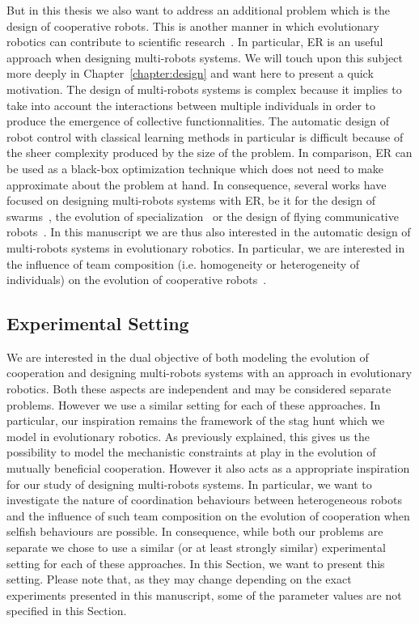     But in this thesis we also want to address an additional problem which is the design of cooperative robots. This is another manner in which evolutionary robotics can contribute to scientific research~\parencite{Trianni2014b, Doncieux2015a}. In particular, ER is an useful approach when designing multi-robots systems. We will touch upon this subject more deeply in Chapter~\ref{chapter:design} and want here to present a quick motivation. The design of multi-robots systems is complex because it implies to take into account the interactions between multiple individuals in order to produce the emergence of collective functionnalities. The automatic design of robot control with classical learning methods in particular is difficult because of the sheer complexity produced by the size of the problem. In comparison, ER can be used as a black-box optimization technique which does not need to make approximate about the problem at hand. In consequence, several works have focused on designing multi-robots systems with ER, be it for the design of swarms~\parencite{Baldassarre2007}, the evolution of specialization~\parencite{Ferrante2015} or the design of flying communicative robots~\parencite{Hauert2014}. In this manuscript we are thus also interested in the automatic design of multi-robots systems in evolutionary robotics. In particular, we are interested in the influence of team composition (i.e. homogeneity or heterogeneity of individuals) on the evolution of cooperative robots~\parencite{Waibel2009}.


  \subsection{Experimental Setting}

    We are interested in the dual objective of both modeling the evolution of cooperation and designing multi-robots systems with an approach in evolutionary robotics. Both these aspects are independent and may be considered separate problems. However we use a similar setting for each of these approaches. In particular, our inspiration remains the framework of the stag hunt which we model in evolutionary robotics. As previously explained, this gives us the possibility to model the mechanistic constraints at play in the evolution of mutually beneficial cooperation. However it also acts as a appropriate inspiration for our study of designing multi-robots systems. In particular, we want to investigate the nature of coordination behaviours between heterogeneous robots and the influence of such team composition on the evolution of cooperation when selfish behaviours are possible. In consequence, while both our problems are separate we chose to use a similar (or at least strongly similar) experimental setting for each of these approaches. In this Section, we want to present this setting. Please note that, as they may change depending on the exact experiments presented in this manuscript, some of the parameter values are not specified in this Section.

